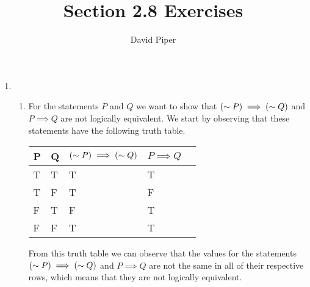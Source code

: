 \documentclass[12pt]{article}
\title{Section 2.8 Exercises}
\author{David Piper}
\makeatletter
\newcommand*{\arabicodd}[1]{%
  \expandafter\@arabicodd\csname c@#1\endcsname
}
\newcommand*{\@arabicodd}[1]{%
  \@arabic{\numexpr(#1)*2-1\relax}%
}
\makeatother
\begin{document}
\maketitle

\begin{enumerate}[label=2.\arabicodd*, start=27]
  \item
        \begin{enumerate}[label=(\alph*)]
          \item
                For the statements $P$ and $Q$ we want to show that $\qty(\sim P) \implies \qty(\sim Q)$
                and $P \implies Q$ are not logically equivalent.
                We start by observing that these statements have the following
                truth table.
                \hfill
                \hfill
                \linebreak
                \linebreak
                \begin{minipage}{\linewidth}
                  \small
                  \begin{tabular}{@{}lllll@{}}
                    \toprule
                    P & Q & $\qty(\sim P) \implies \qty(\sim Q)$ & $P \implies Q$ \\ \midrule
                    T & T & T                                    & T              \\
                    T & F & T                                    & F              \\
                    F & T & F                                    & T              \\
                    F & F & T                                    & T              \\
                    \bottomrule
                  \end{tabular}
                \end{minipage}
                \linebreak
                \linebreak
                \linebreak
                \linebreak
                From this truth table we can observe that the values for the
                statements $\qty(\sim P) \implies \qty(\sim Q)$ and $P \implies Q$
                are not the same in all of their respective rows, which means that
                they are not logically equivalent.

\end{enumerate}
\end{enumerate}
\end{document}
